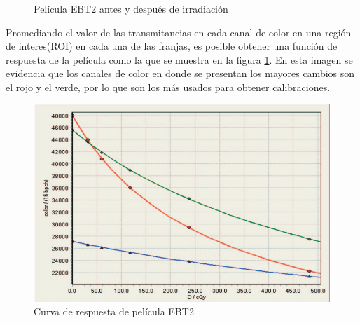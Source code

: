 \begin{figure}[H]
	\centering
	\hfill
	\caption{Película EBT2 antes y después de irradiación}
\end{figure}

Promediando el valor de las transmitancias en cada canal de color en una región de interes(ROI) en cada una de las franjas, es posible obtener una función de respuesta de la película como la que se muestra en la figura \ref{fig:curvaRespuesta}. En esta imagen se evidencia que los canales de color en donde se presentan los mayores cambios son el rojo y el verde, por lo que son los más usados para obtener calibraciones.\\

\begin{figure}[H]
	\centering
	\includegraphics[width=0.5\linewidth]{images/respses.png}
	\caption{Curva de respuesta de película EBT2\cite{manualEBT2}}
	\label{fig:curvaRespuesta}
\end{figure}


